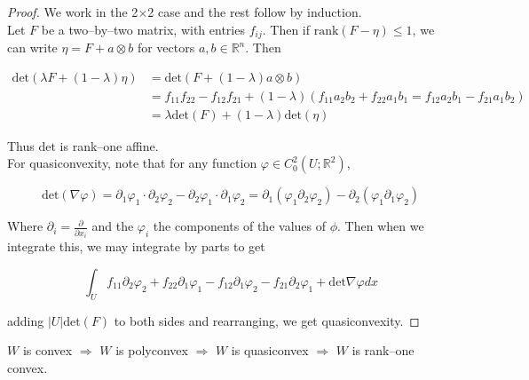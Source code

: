 \documentclass[../main.tex]{subfiles}
\begin{document}
\begin{proof}
	We work in the 2$\times$2 case and the rest follow by induction. \\

	Let $F$ be a two--by--two matrix, with entries $f_{ij}$.
	Then if $\mathrm{rank}(F - \eta) \leq 1$, we can write $\eta = F + a \otimes b$ for vectors $a,b \in \mathbb{R}^n$.
	Then

	\begin{align*}
		\mathrm{det} ( \lambda F + (1- \lambda) \eta) & = \mathrm{det} ( F + (1-\lambda) a \otimes b)                                                                \\
		                                              & = f_{11} f_{22} - f_{12}f_{21} + (1-\lambda) (f_{11} a_2b_2 + f_{22} a_1b_1 = f_{12} a_2b_1 - f_{21} a_1b_2) \\
		                                              & = \lambda \mathrm{det}(F) + (1-\lambda) \mathrm{det} (\eta)
	\end{align*}

	Thus $\mathrm{det}$ is rank--one affine. \\

	For quasiconvexity, note that for any function $\varphi \in C_0^2( U; \mathbb{R}^2)$,

	\begin{equation*}
		\mathrm{det} ( \nabla \varphi) = \partial_1\varphi_1 \cdot \partial_2\varphi_2 - \partial_2\varphi_1 \cdot \partial_1 \varphi_2 = \partial_1 ( \varphi_1 \partial_2 \varphi_2) - \partial_2 ( \varphi_1 \partial_1 \varphi_2)
	\end{equation*}

	Where $\partial_i = \frac{\partial}{\partial x_i}$ and the $\varphi_i$ the components of the values of $\phi$.
	Then when we integrate this, we may integrate by parts to get

	\begin{equation*}
		\int_U f_{11} \partial_2 \varphi_2 + f_{22} \partial_1 \varphi_1 - f_{12} \partial_1 \varphi_2 - f_{21} \partial_2 \varphi_1 + \mathrm{det} \nabla \varphi dx
	\end{equation*}

	adding $\left| U \right| \mathrm{det} (F)$ to both sides and rearranging, we get quasiconvexity.

\end{proof}


\begin{thm}
	$W$ is convex $\Rightarrow$ $W$ is polyconvex $\Rightarrow$ $W$ is quasiconvex $\Rightarrow$ $W$ is rank--one convex.
\end{thm}
\end{document}
